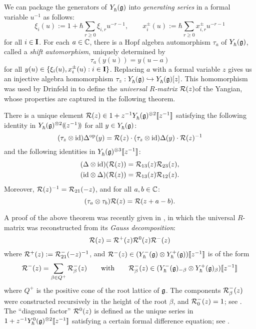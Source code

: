 We can package the generators of $\Yhg$ into \emph{generating series} in a formal variable $u^{-1}$ as follows:
\begin{equation}\label{eqn:gen-series}
    \xi_i(u) := 1+\hbar\sum_{r\geq 0}\xi_{i,r}u^{-r-1}, \qquad x^\pm_i(u) := \hbar\sum_{r\geq 0}x^\pm_{i,r}u^{-r-1}
\end{equation}
for all $i\in\I$.
For each $a\in\C$, there is a Hopf algebra automorphism $\tau_a$ of $\Yhg$, called a \emph{shift automorphism}, uniquely determined by
\[\tau_a(y(u)) = y(u-a)\]
for all $y(u)\in\{\xi_i(u),x^\pm_i(u) : i\in\I\}$.
Replacing $a$ with a formal variable $z$ gives us an injective algebra homomorphism $\tau_z:\Yhg\inj\Yhg[][z]$.
This homomorphism was used by Drinfeld in \cite{drinfeld_hopf_1985} to define the \emph{universal $R$-matrix} $\rmat(z)$of the Yangian, whose properties are captured in the following theorem.

\begin{theorem}\label{T:R}
    There is a unique element $\rmat(z)\in 1+z^{-1}\Yhg^{\otimes 2}\db{z^{-1}}$ satisfying the following identity in $\Yhg^{\otimes 2}\dparen{z^{-1}}$ for all $y\in\Yhg$:
    \[(\tau_z\otimes{\id})\Delta^{\mathrm{op}}(y) = \rmat(z) \cdot (\tau_z\otimes{\id})\Delta(y) \cdot \rmat(z)^{-1}\]
    and the following identities in $\Yhg^{\otimes 3}\db{z^{-1}}$:
    \begin{gather*}
        (\Delta\otimes{\id})(\rmat(z)) = \rmat_{13}(z)\rmat_{23}(z), \\
        ({\id}\otimes\Delta)(\rmat(z)) = \rmat_{13}(z)\rmat_{12}(z).
    \end{gather*}
    Moreover, $\rmat(z)^{-1} = \rmat_{21}(-z)$, and for all $a,b\in\C$:
    \[(\tau_a\otimes\tau_b)\rmat(z) = \rmat(z+a-b).\]
\end{theorem}

A proof of the above theorem was recently given in \cite{gautam_meromorphic_2021}, in which the universal $R$-matrix was reconstructed from its \emph{Gauss decomposition}:
\[\rmat(z) = \rmat^+(z)\rmat^0(z)\rmat^-(z)\]
where $\rmat^+(z) := \rmat^-_{21}(-z)^{-1}$, and $\rmat^-(z)\in(\Yhg[-]\otimes\Yhg[+])\db{z^{-1}}$ is of the form
\[\rmat^-(z) = \sum_{\beta\in Q^+}\rmat_\beta^-(z) \qquad\text{with}\qquad \rmat_\beta^-(z) \in(\Yhg[-]_{-\beta}\otimes\Yhg[+]_\beta)\db{z^{-1}}\]
where $Q^+$ is the positive cone of the root lattice of $\g$.
The components $\rmat_\beta^-(z)$ were constructed recursively in the height of the root $\beta$, and $\rmat_0^-(z)=1$; see \cite[\S 4.2]{gautam_meromorphic_2021}.
The ``diagonal factor'' $\rmat^0(z)$ is defined as the unique series in $1+z^{-1}\Yhg[0]^{\otimes 2}\db{z^{-1}}$ satisfying a certain formal difference equation; see \cite[\S6]{gautam_meromorphic_2021}.


